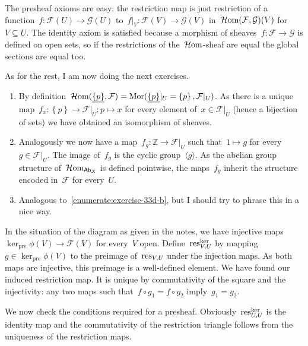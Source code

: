 \begin{exercise} %
  The presheaf axioms are easy: the restriction map is just restriction of a function~$f\colon\mathcal{F}(U)\to\mathcal{G}(U)$ to~$f|_V\colon\mathcal{F}(V)\to\mathcal{G}(V)$ in~$\operatorname{\mathcal{H}om}(\mathcal{F},\mathcal{G})(V)$ for~$V\subseteq U$. The identity axiom is satisfied because a morphism of sheaves~$f\colon\mathcal{F}\to\mathcal{G}$ is defined on open sets, so if the restrictions of the~$\operatorname{\mathcal{H}om}$\nobreakdash-sheaf are equal the global sections are equal too. 

  As for the rest, I am now doing the next exercises.
\end{exercise}

\begin{exercise} %
  \begin{enumerate}
    \item By definition~$\operatorname{\mathcal{H}om}(\underline{\left\{ p \right\}},\mathcal{F})=\operatorname{Mor}(\underline{\left\{ p \right\}}|_U=\left\{ p \right\},\mathcal{F}|_U)$. As there is a unique map~$f_x\colon\left\{ p \right\}\to\mathcal{F}|_U:p\mapsto x$ for every element of~$x\in\mathcal{F}|_U$ (hence a bijection of sets) we have obtained an isomorphism of sheaves.

    \item\label{enumerate:exercise-33d-b} Analogously we now have a map~$f_g\colon\mathbb{Z}\to\mathcal{F}|_U$ such that~$1\mapsto g$ for every~$g\in\mathcal{F}|_U$. The image of~$f_g$ is the cyclic group~$\langle g\rangle$. As the abelian group structure of~$\operatorname{\mathcal{H}om}_{\mathsf{Ab}_X}$ is defined pointwise, the maps~$f_g$ inherit the structure encoded in~$\mathcal{F}$ for every~$U$.

    \item Analogous to~\ref{enumerate:exercise-33d-b}, but I should try to phrase this in a nice way.
  \end{enumerate}
\end{exercise}

\begin{exercise}
  In the situation of the diagram as given in the notes, we have injective maps~$\ker_{\textrm{pre}}\phi(V)\to\mathcal{F}(V)$ for every~$V$ open. Define~$\operatorname{res}^{\ker}_{V,U}$ by mapping~$g\in\ker_{\textrm{pre}}\phi(V)$ to the preimage of~$\operatorname{res}_{V,U}$ under the injection maps. As both maps are injective, this preimage is a well-defined element. We have found our induced restriction map. It is unique by commutativity of the square and the injectivity: any two maps such that~$f\circ g_1=f\circ g_2$ imply~$g_1=g_2$.

  We now check the conditions required for a presheaf. Obviously~$\operatorname{res}^{\ker}_{U,U}$ is the identity map and the commutativity of the restriction triangle follows from the uniqueness of the restriction maps.
\end{exercise}

